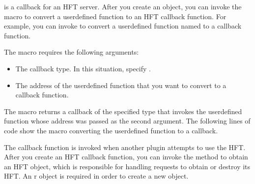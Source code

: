 \documentclass[letterpaper,12pt,english,openany,oneside]{sphinxmanual}
\begin{document}
 is a callback for an HFT server. After you create an  object, you can invoke the  macro to convert a user\sphinxhyphen{}defined function to an HFT callback function. For example, you can invoke  to convert a user\sphinxhyphen{}defined function named  to a callback function.

The  macro requires the following arguments:
\begin{itemize}
\item {} 
The callback type. In this situation, specify .

\item {} 
The address of the user\sphinxhyphen{}defined function that you want to convert to a callback function.

\end{itemize}

The  macro returns a callback of the specified type that invokes the user\sphinxhyphen{}defined function whose address was passed as the second argument. The following lines of code show the  macro converting the  user\sphinxhyphen{}defined function to a  callback.

\begin{sphinxVerbatim}[commandchars=\\\{\}]
  
  
\end{sphinxVerbatim}

The callback function is invoked when another plugin attempts to use the HFT. After you create an HFT callback function, you can invoke the  method to obtain an HFT  object, which is responsible for handling requests to obtain or destroy its HFT. An  r object is required in order to create a new  object.
\end{document}
